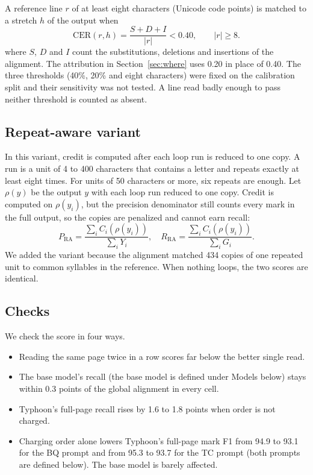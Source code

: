 A reference line $r$ of at least eight characters (Unicode code points) is matched to a stretch $h$ of the output when
\begin{equation}
\mathrm{CER}(r,h)=\frac{S+D+I}{|r|}<0.40,\qquad |r|\ge 8.
\end{equation}
where $S$, $D$ and $I$ count the substitutions, deletions and insertions of the alignment. The attribution in Section~\ref{sec:where} uses 0.20 in place of 0.40. The three thresholds (40\%, 20\% and eight characters) were fixed on the calibration split and their sensitivity was not tested. A line read badly enough to pass neither threshold is counted as absent.

\subsection{Repeat-aware variant}
In this variant, credit is computed after each loop run is reduced to one copy. A run is a unit of 4 to 400 characters that contains a letter and repeats exactly at least eight times. For units of 50 characters or more, six repeats are enough. Let $\rho(y)$ be the output $y$ with each loop run reduced to one copy. Credit is computed on $\rho(y_i)$, but the precision denominator still counts every mark in the full output, so the copies are penalized and cannot earn recall:
\begin{equation}
P_{\mathrm{RA}}=\frac{\sum_i C_i(\rho(y_i))}{\sum_i Y_i},\quad
R_{\mathrm{RA}}=\frac{\sum_i C_i(\rho(y_i))}{\sum_i G_i}.
\end{equation} We added the variant because the alignment matched 434 copies of one repeated unit to common syllables in the reference. When nothing loops, the two scores are identical.

\subsection{Checks}
We check the score in four ways.
\begin{itemize}
\item Reading the same page twice in a row scores far below the better single read.
\item The base model's recall (the base model is defined under Models below) stays within 0.3 points of the global alignment in every cell.
\item Typhoon's full-page recall rises by 1.6 to 1.8 points when order is not charged.
\item Charging order alone lowers Typhoon's full-page mark F1 from 94.9 to 93.1 for the BQ prompt and from 95.3 to 93.7 for the TC prompt (both prompts are defined below). The base model is barely affected.
\end{itemize}

